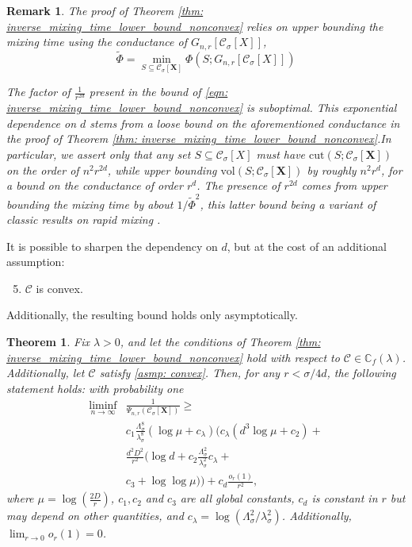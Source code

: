 \documentclass{article}
\newcommand{\vol}{\mathrm{vol}}
\newcommand{\cut}{\mathrm{cut}}
\newcommand{\1}{\mathbf{1}}
\newcommand{\Xbf}{\mathbf{X}}
\newcommand{\Cbb}{\mathbb{C}}
\newcommand{\Cset}{\mathcal{C}}
\newcommand{\Csig}{\Cset_{\sigma}}
\theoremstyle{aldenthm}
\newtheorem{theorem}{Theorem}
\theoremstyle{aldenrmrk}
\newtheorem{remark}{Remark}
\begin{document}
\begin{remark}
	The proof of Theorem \ref{thm: inverse_mixing_time_lower_bound_nonconvex} relies on upper bounding the mixing time using the \emph{conductance} of $G_{n,r}[\Csig[X]]$,
	\begin{equation*}
	\widetilde{\Phi} = \min_{S \subseteq \Csig[\Xbf]} \Phi(S; G_{n,r}[\Csig[X]])
	\end{equation*}
	
	The factor of $\frac{1}{r^{2d}}$ present in the bound of \eqref{eqn: inverse_mixing_time_lower_bound_nonconvex} is suboptimal. This exponential dependence on $d$ stems from a loose bound on the aforementioned conductance in the proof of Theorem \ref{thm: inverse_mixing_time_lower_bound_nonconvex}.In particular, we assert only that any set $S \subseteq \Csig[X]$ must have $\cut(S; \Csig[\Xbf])$ on the order of $n^2 r^{2d}$, while upper bounding $\vol(S; \Csig[\Xbf])$ by roughly $n^2 r^d$, for a bound on the conductance of order $r^d$. The presence of $r^{2d}$ comes from upper bounding the mixing time by about $1/\widetilde{\Phi}^2$, this latter bound being a variant of classic results on rapid mixing \cite{jerrum89}.
\end{remark}

It is possible to sharpen the dependency on $d$, but at the cost of an additional assumption:
\begin{enumerate}[label=(A\arabic*)]
	\setcounter{enumi}{4}
	\item 
	\label{asmp: convex}
	$\Cset$ is convex.
\end{enumerate}
Additionally, the resulting bound holds only asymptotically. 

\begin{theorem}
	\label{thm: inverse_mixing_time_lower_bound}
	Fix $\lambda > 0$, and let the conditions of Theorem \ref{thm: inverse_mixing_time_lower_bound_nonconvex} hold with respect to $\Cset \in \Cbb_f(\lambda)$. Additionally, let $\Cset$ satisfy \ref{asmp: convex}. Then, for any $r < \sigma/4d$, the following statement holds: with probability one
	\begin{align}
	\label{eqn: inverse_mixing_time_lower_bound}
	\liminf_{n \to \infty} & \frac{1}{\Psi_{n,r}(\Csig[\Xbf])} \geq \nonumber \\ & c_1 \frac{\Lambda_{\sigma}^8}{\lambda_{\sigma}^8} (\log \mu + c_{\lambda}) \biggl( c_{\lambda}(d^3 \log\mu + c_2) + \nonumber \\
	& \frac{d^2D^2}{r^2} \bigl( \log d + c_2 \frac{\Lambda_{\sigma}^{2}}{\lambda_{\sigma}^{2}}c_{\lambda} + \nonumber \\
	& c_3  + \log \log \mu \bigr) \biggr) + c_d \frac{o_r(1)}{r^2},
	\end{align}
	where $\mu = \log(\frac{2D}{r})$, $c_1,c_2$ and $c_3$ are all global constants, $c_d$ is constant in $r$ but may depend on other quantities,  and $c_{\lambda} = \log(\Lambda_{\sigma}^2/ \lambda_{\sigma}^2)$.  Additionally, $\lim_{r \to 0} o_r(1) = 0$. 
\end{theorem}
\end{document}
